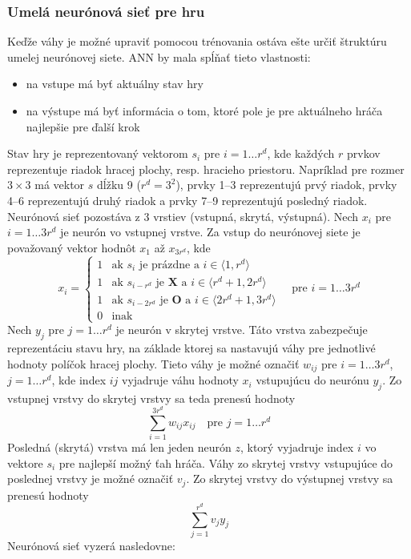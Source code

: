 \subsubsection{Umelá neurónová sieť pre hru}

Keďže váhy je možné upraviť pomocou trénovania ostáva ešte určiť štruktúru umelej neurónovej siete.
ANN by mala spĺňať tieto vlastnosti:
\begin{itemize}
    \item na vstupe má byť aktuálny stav hry
    \item na výstupe má byť informácia o tom, ktoré pole je pre aktuálneho hráča najlepšie pre ďalší krok
\end{itemize}

Stav hry je reprezentovaný vektorom $s_i$ pre $i=1 \dots r^d$, kde každých $r$ prvkov reprezentuje riadok hracej plochy,
resp. hracieho priestoru.
Napríklad pre rozmer $3 \times 3$ má vektor $s$ dĺžku 9 ($r^d=3^2$), prvky 1--3 reprezentujú prvý riadok, prvky
4--6 reprezentujú druhý riadok a prvky 7--9 reprezentujú posledný riadok.
Neurónová sieť pozostáva z 3 vrstiev (vstupná, skrytá, výstupná).
Nech $x_i$ pre $i=1 \dots 3r^d$ je neurón vo vstupnej vrstve.
Za vstup do neurónovej siete je považovaný vektor hodnôt $x_1$ až $x_{3r^d}$, kde
\begin{equation}
    x_i=
    \begin{cases}
        1 & \text{ak }s_i\text{ je prázdne a } i \in \langle 1, r^d \rangle \\
        1 & \text{ak }s_{i-r^d}\text{ je }\textbf{X}\text{ a } i \in \langle r^d+1, 2r^d \rangle \\
        1 & \text{ak }s_{i-2r^d}\text{ je }\textbf{O}\text{ a } i \in \langle 2r^d+1, 3r^d \rangle \\
        0 & \text{inak}
    \end{cases}
    \quad
    \text{pre }i=1 \dots 3r^d
\end{equation}
Nech $y_j$ pre $j=1 \dots r^d$ je neurón v skrytej vrstve.
Táto vrstva zabezpečuje reprezentáciu stavu hry, na základe ktorej sa nastavujú váhy pre jednotlivé hodnoty políčok
hracej plochy.
Tieto váhy je možné označiť $w_{ij}$ pre $i=1 \dots 3r^d$, $j=1 \dots r^d$, kde index $ij$ vyjadruje váhu hodnoty
$x_i$ vstupujúcu do neurónu $y_j$.
Zo vstupnej vrstvy do skrytej vrstvy sa teda prenesú hodnoty
\begin{equation}
    \sum_{i=1}^{3r^d} w_{ij}x_{ij} \quad \text{pre } j=1 \dots r^d
\end{equation}
Posledná (skrytá) vrstva má len jeden neurón $z$, ktorý vyjadruje index $i$ vo vektore $s_i$ pre najlepší možný ťah
hráča.
Váhy zo skrytej vrstvy vstupujúce do poslednej vrstvy je možné označiť $v_j$.
Zo skrytej vrstvy do výstupnej vrstvy sa prenesú hodnoty
\begin{equation}
    \sum_{j=1}^{r^d} v_{j}y_{j}
\end{equation}
Neurónová sieť vyzerá nasledovne:

